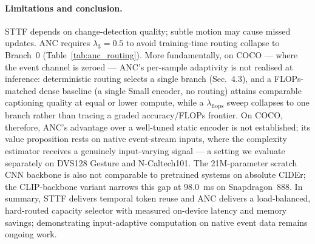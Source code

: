 \documentclass{article}
\begin{document}
\paragraph{Limitations and conclusion.}
STTF depends on change-detection quality; subtle motion may cause missed updates. ANC requires $\lambda_3{=}0.5$ to avoid training-time routing collapse to Branch~0 (Table~\ref{tab:anc_routing}). More fundamentally, on COCO --- where the event channel is zeroed --- ANC's per-sample adaptivity is not realised at inference: deterministic routing selects a single branch (Sec.~4.3), and a FLOPs-matched dense baseline (a single Small encoder, no routing) attains comparable captioning quality at equal or lower compute, while a $\lambda_{\text{flops}}$ sweep collapses to one branch rather than tracing a graded accuracy/FLOPs frontier. On COCO, therefore, ANC's advantage over a well-tuned static encoder is not established; its value proposition rests on native event-stream inputs, where the complexity estimator receives a genuinely input-varying signal --- a setting we evaluate separately on DVS128 Gesture and N-Caltech101. The 21M-parameter scratch CNN backbone is also not comparable to pretrained systems on absolute CIDEr; the CLIP-backbone variant narrows this gap at $98.0$~ms on Snapdragon~888. In summary, STTF delivers temporal token reuse and ANC delivers a load-balanced, hard-routed capacity selector with measured on-device latency and memory savings; demonstrating input-adaptive computation on native event data remains ongoing work.
\end{document}
